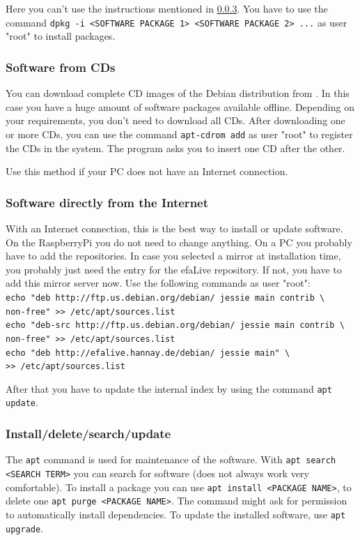 \documentclass[a4paper,12pt,twoside]{article}
\begin{document}
Here you can't use the instructions mentioned in \ref{sct:software_install}.
You have to use the command \texttt{dpkg -i {\textless}SOFTWARE
PACKAGE 1{\textgreater} {\textless}SOFTWARE PACKAGE 2{\textgreater}
...} as user "root" to install packages.


\subsubsection{Software from CDs}
\label{sct:software_cd}
You can download complete CD images of the Debian distribution from
\cite{DEB4}. In this case you have a huge amount of software packages
available offline. Depending on your requirements, you
don't need to download all CDs. After downloading one
or more CDs, you can use the command \texttt{apt-cdrom
add} as user "root" to
register the CDs in the system. The program asks you to insert one CD
after the other.

Use this method if your PC does not have an Internet connection.


\subsubsection{Software directly from the Internet}
\label{sct:software_internet}
With an Internet connection, this is the best way to install or update
software. On the RaspberryPi you do not need to change anything. On a PC you 
probably have to add the repositories. In case you 
selected a mirror at installation time, you probably just
need the entry for the efaLive repository. If not, you have to add this mirror 
server now. Use the following commands as user "root":
\bigskip
\\
\texttt{echo "deb http://ftp.us.debian.org/debian/ jessie main contrib \textbackslash\\
    non-free"\ {\textgreater}{\textgreater} /etc/apt/sources.list}
\\
\texttt{echo "deb-src http://ftp.us.debian.org/debian/ jessie main contrib \textbackslash\\
    non-free"\ {\textgreater}{\textgreater} /etc/apt/sources.list}
\\
\texttt{echo "deb http://efalive.hannay.de/debian/ jessie main" \textbackslash\\
    {\textgreater}{\textgreater} /etc/apt/sources.list}

\bigskip
After that you have to update the internal index by using the command
\texttt{apt update}.


\subsubsection{Install/delete/search/update}
\label{sct:software_install}
The \texttt{apt} command is used for maintenance
of the software. With \texttt{apt search {\textless}SEARCH
TERM{\textgreater}} you can search for software (does not
always work very comfortable). To install a package you can use
\texttt{apt install {\textless}PACKAGE
NAME{\textgreater}}, to delete one
\texttt{apt purge {\textless}PACKAGE
NAME{\textgreater}}. The command might ask for permission
to automatically install dependencies. To update the installed
software, use \texttt{apt upgrade}.
\end{document}
